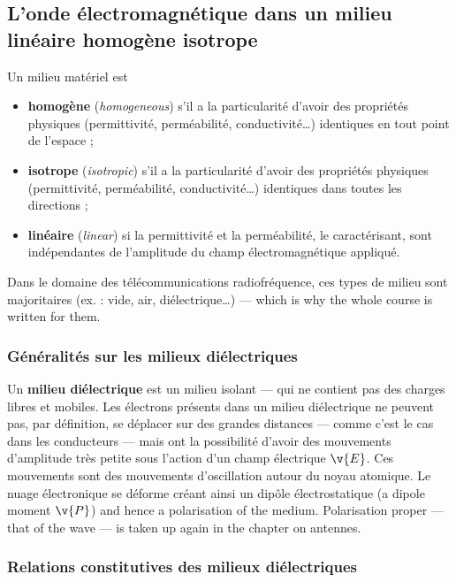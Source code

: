 \subsection{L'onde électromagnétique dans un milieu linéaire homogène isotrope}

\begin{definition}
  Un milieu matériel est
  \begin{itemize}
    \item \textbf{homogène} (\textit{homogeneous}) s'il a la particularité
      d'avoir des propriétés physiques (permittivité, perméabilité,
      conductivité…) identiques en tout point de l'espace ;
    \item \textbf{isotrope} (\textit{isotropic}) s'il a la particularité
      d'avoir des propriétés physiques (permittivité, perméabilité,
      conductivité…) identiques dans toutes les directions ;
    \item \textbf{linéaire} (\textit{linear}) si la permittivité et la
      perméabilité, le caractérisant, sont indépendantes de l'amplitude du
      champ électromagnétique appliqué.
  \end{itemize}
\end{definition}

Dans le domaine des télécommunications radiofréquence, ces types de milieu sont
majoritaires (ex. : vide, air, diélectrique…) --- which is why the whole course
is written for them.

\subsubsection{Généralités sur les milieux diélectriques}

Un \textbf{milieu diélectrique} est un milieu isolant --- qui ne contient pas
des charges libres et mobiles. Les électrons présents dans un milieu
diélectrique ne peuvent pas, par définition, se déplacer sur des grandes
distances --- comme c'est le cas dans les conducteurs --- mais ont la
possibilité d'avoir des mouvements d'amplitude très petite sous l'action d'un
champ électrique $\v{E}$. Ces mouvements sont des mouvements d'oscillation
autour du noyau atomique. Le nuage électronique se déforme créant ainsi un
dipôle électrostatique (a dipole moment $\v{P}$) and hence a polarisation of the
medium. Polarisation proper --- that of the wave --- is taken up again in the
chapter on antennes.

\subsubsection{Relations constitutives des milieux diélectriques}

